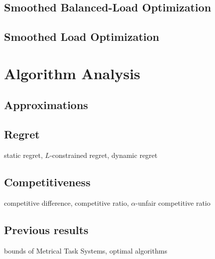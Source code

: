 \subsection{Smoothed Balanced-Load Optimization}

\subsection{Smoothed Load Optimization}

\section{Algorithm Analysis}

\subsection{Approximations}

\subsection{Regret}

static regret, $L$-constrained regret, dynamic regret

\subsection{Competitiveness}

competitive difference, competitive ratio, $\alpha$-unfair competitive ratio

\subsection{Previous results}

bounds of Metrical Task Systems, optimal algorithms
